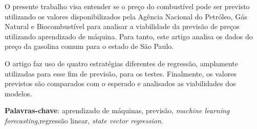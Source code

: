 \begin{resumoumacoluna}
O presente trabalho visa entender se o preço do combustível pode ser previsto utilizando os 
valores disponibilizados pela Agência Nacional do Petróleo, Gás Natural e Biocombustível para analisar a viabilidade da previsão de preços utilizando aprendizado de máquina. Para tanto, este artigo analisa os dados do preço da gasolina comum para o estado de São Paulo.
 
 O artigo faz uso de quatro estratégias diferentes de regressão, amplamente utilizadas para esse fim de previsão, para os testes. Finalmente, os valores previstos são comparados com o esperado e analisados as viabilidades dos modelos.

 \vspace{\onelineskip}
 
 \noindent
 \textbf{Palavras-chave}: aprendizado de máquinas, previsão, \textit{machine learning forecasting},regressão linear, \textit{state vector regression}.
\end{resumoumacoluna}